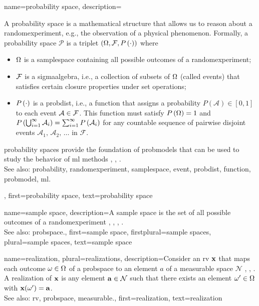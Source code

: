  {name={probability space}, 
 	description={A \gls{probability} space is a mathematical 
 		structure that allows us to reason about a \gls{randomexperiment}, e.g., the observation 
		of a physical phenomenon. 
 	   	Formally, a \gls{probability} space $\mathcal{P}$ is a triplet $(\Omega, \mathcal{F}, P\left(\cdot\right))$ where
 		\begin{itemize} 
 			\item  $\Omega$ is a \gls{samplespace} containing all possible outcomes of a \gls{randomexperiment};
 			\item  $\mathcal{F}$ is a \gls{sigmaalgebra}, i.e., a collection of subsets of 
			$\Omega$ (called \glspl{event}) that satisfies certain closure properties under set operations;
 			\item $P\left(\cdot\right)$ is a \gls{probdist}, i.e., a \gls{function} that assigns a \gls{probability} $P(\mathcal{A}) \in [0,1]$ 
 			to each \gls{event} $\mathcal{A} \in \mathcal{F}$. This \gls{function} must satisfy $P\left(\Omega\right) = 1$ and 
			$P\left(\bigcup_{i=1}^{\infty} \mathcal{A}_i\right) = \sum_{i=1}^{\infty} P\left(\mathcal{A}_i\right)$ for any 
 			countable sequence of pairwise disjoint \glspl{event} $\mathcal{A}_1, \,\mathcal{A}_2, \,\ldots$ in $\mathcal{F}$.
 		\end{itemize}
 		\Gls{probability} spaces provide the foundation of \glspl{probmodel} that can be 
		used to study the behavior of \gls{ml} methods \cite{BillingsleyProbMeasure}, \cite{GrayProbBook}, \cite{ross2013first}.
				\\
		See also: \gls{probability}, \gls{randomexperiment}, \gls{samplespace}, \gls{event}, \gls{probdist}, \gls{function}, \gls{probmodel}, \gls{ml}.},  
 	first={probability space}, 
 	text={probability space}
 }
 
 
  {name={sample space}, 
  	description={A \gls{sample} space is the set of all possible 
		outcomes of a \gls{randomexperiment} \cite{BillingsleyProbMeasure}, 
		\cite{BertsekasProb}, \cite{papoulis}, \cite{AshProbMeasure}. 
		\\
 		See also: \gls{probspace}.},  
  	first={sample space}, 
 	firstplural={sample spaces},
 	plural={sample spaces},
  	text={sample space}
  }
 
	
{name={realization}, plural={realizations},
	description={Consider an \gls{rv} ${\bf x}$ that maps each outcome 
		$\omega \in \Omega$ of a \gls{probspace} to an element $a$ of a 
		\gls{measurable} space $\mathcal{N}$ \cite{RudinBookPrinciplesMatheAnalysis}, \cite{BillingsleyProbMeasure}, \cite{HalmosMeasure}. 
		A realization of ${\bf x}$ is any element ${\bf a} \in \mathcal{N}$ such that there exists 
		an element $\omega' \in \Omega$ with ${\bf x}(\omega') = {\bf a}$.
			\\
		See also: \gls{rv}, \gls{probspace}, \gls{measurable}.}, 
	first={realization},
	text={realization}  
}

